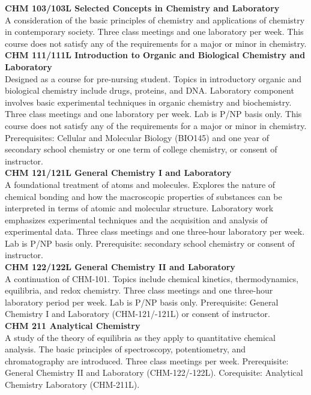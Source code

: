 \documentclass[
  letterpaper,
]{scrbook}
\begin{document}
\textbf{CHM 103/103L Selected Concepts in Chemistry and Laboratory}\\
A consideration of the basic principles of chemistry and applications of
chemistry in contemporary society. Three class meetings and one
laboratory per week. This course does not satisfy any of the
requirements for a major or minor in chemistry.\\
\textbf{CHM 111/111L Introduction to Organic and Biological Chemistry
and Laboratory}\\
Designed as a course for pre-nursing student. Topics in introductory
organic and biological chemistry include drugs, proteins, and DNA.
Laboratory component involves basic experimental techniques in organic
chemistry and biochemistry. Three class meetings and one laboratory per
week. Lab is P/NP basis only. This course does not satisfy any of the
requirements for a major or minor in chemistry. Prerequisites: Cellular
and Molecular Biology (BIO145) and one year of secondary school
chemistry or one term of college chemistry, or consent of instructor.\\
\textbf{CHM 121/121L General Chemistry I and Laboratory}\\
A foundational treatment of atoms and molecules. Explores the nature of
chemical bonding and how the macroscopic properties of substances can be
interpreted in terms of atomic and molecular structure. Laboratory work
emphasizes experimental techniques and the acquisition and analysis of
experimental data. Three class meetings and one three-hour laboratory
per week. Lab is P/NP basis only. Prerequisite: secondary school
chemistry or consent of instructor.\\
\textbf{CHM 122/122L General Chemistry II and Laboratory}\\
A continuation of CHM-101. Topics include chemical kinetics,
thermodynamics, equilibria, and redox chemistry. Three class meetings
and one three-hour laboratory period per week. Lab is P/NP basis only.
Prerequisite: General Chemistry I and Laboratory (CHM-121/-121L) or
consent of instructor.\\
\textbf{CHM 211 Analytical Chemistry}\\
A study of the theory of equilibria as they apply to quantitative
chemical analysis. The basic principles of spectroscopy, potentiometry,
and chromatography are introduced. Three class meetings per week.
Prerequisite: General Chemistry II and Laboratory (CHM-122/-122L).
Corequisite: Analytical Chemistry Laboratory (CHM-211L).\\
\end{document}
